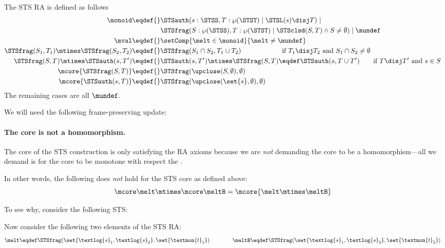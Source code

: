 The STS RA is defined as follows
\begin{align*}
  \monoid \eqdef{}& \STSauth(s:\STSS, T:\wp(\STST) \mid \STSL(s) \disj T) \mid{}\\& \STSfrag(S: \wp(\STSS), T: \wp(\STST) \mid \STSclsd(S, T) \land S \neq \emptyset) \mid \mundef \\
  \mval \eqdef{}& \setComp{\melt\in\monoid}{\melt \neq \mundef} \\
  \STSfrag(S_1, T_1) \mtimes \STSfrag(S_2, T_2) \eqdef{}& \STSfrag(S_1 \cap S_2, T_1 \cup T_2) \qquad\qquad\qquad \text{if $T_1 \disj T_2$ and $S_1 \cap S_2 \neq \emptyset$} \\
  \STSfrag(S, T) \mtimes \STSauth(s, T') \eqdef{}& \STSauth(s, T') \mtimes \STSfrag(S, T) \eqdef \STSauth(s, T \cup T') \qquad \text{if $T \disj T'$ and $s \in S$} \\
  \mcore{\STSfrag(S, T)} \eqdef{}& \STSfrag(\upclose(S, \emptyset), \emptyset) \\
  \mcore{\STSauth(s, T)} \eqdef{}& \STSfrag(\upclose(\set{s}, \emptyset), \emptyset)
\end{align*}
The remaining cases are all $\mundef$.

We will need the following frame-preserving update:

\paragraph{The core is not a homomorphism.}
The core of the STS construction is only satisfying the RA axioms because we are \emph{not} demanding the core to be a homomorphism---all we demand is for the core to be monotone with respect the .

In other words, the following does \emph{not} hold for the STS core as defined above:
\[ \mcore\melt \mtimes \mcore\meltB = \mcore{\melt\mtimes\meltB} \]

To see why, consider the following STS:
\newcommand\st{\textlog{s}}
\newcommand\tok{\textmon{t}}
\begin{center}
\end{center}
Now consider the following two elements of the STS RA:
\[ \melt \eqdef \STSfrag(\set{\st_1,\st_2}, \set{\tok_1}) \qquad\qquad
  \meltB \eqdef \STSfrag(\set{\st_1,\st_3}, \set{\tok_2}) \]


